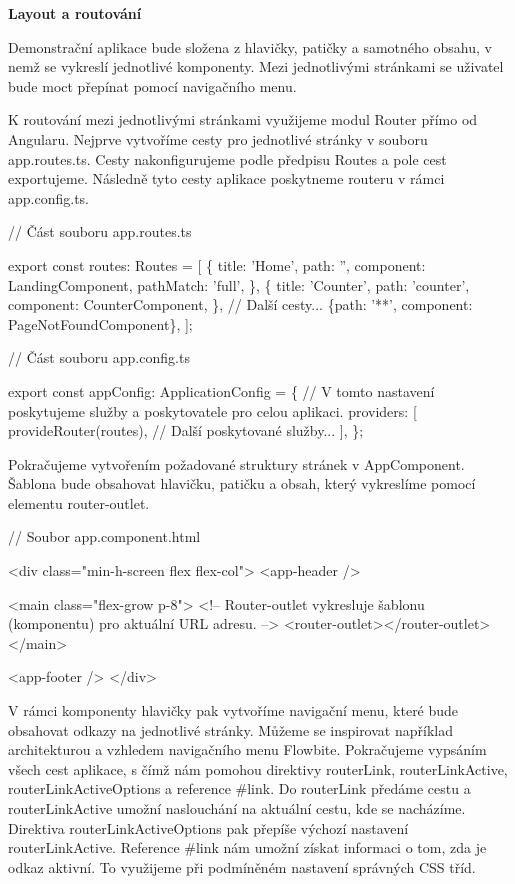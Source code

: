 \begin{flushleft}
  \textbf{Layout a routování}
\end{flushleft}

Demonstrační aplikace bude složena z hlavičky, patičky a samotného obsahu, v nemž se vykreslí jednotlivé komponenty. 
Mezi jednotlivými stránkami se uživatel bude moct přepínat pomocí navigačního menu.

K routování mezi jednotlivými stránkami využijeme modul Router přímo od Angularu. Nejprve vytvoříme cesty pro jednotlivé stránky v souboru app.routes.ts. 
Cesty nakonfigurujeme podle předpisu Routes a pole cest exportujeme. Následně tyto cesty aplikace poskytneme routeru v rámci app.config.ts.

\begin{prog}
// Část souboru app.routes.ts

export const routes: Routes = [
  \{
    title: 'Home',
    path: '',
    component: LandingComponent,
    pathMatch: 'full',
  \},
  \{
    title: 'Counter',
    path: 'counter',
    component: CounterComponent,
  \},
  // Další cesty...
  \{path: '**', component: PageNotFoundComponent\},
];

// Část souboru app.config.ts

export const appConfig: ApplicationConfig = \{
  // V tomto nastavení poskytujeme služby a poskytovatele pro celou aplikaci.
  providers: [
    provideRouter(routes),
    // Další poskytované služby...
  ],
\};
\end{prog}

Pokračujeme vytvořením požadované struktury stránek v AppComponent. Šablona bude obsahovat hlavičku, patičku a obsah, který vykreslíme pomocí elementu router-outlet. 

\begin{prog}
// Soubor app.component.html

<div class="min-h-screen flex flex-col">
  <app-header />

  <main class="flex-grow p-8">
    <!-- Router-outlet vykresluje šablonu (komponentu) pro aktuální URL adresu. -->
    <router-outlet></router-outlet>
  </main>

  <app-footer />
</div>
\end{prog}

V rámci komponenty hlavičky pak vytvoříme navigační menu, které bude obsahovat odkazy na jednotlivé stránky. 
Můžeme se inspirovat například architekturou a vzhledem navigačního menu Flowbite. 
Pokračujeme vypsáním všech cest aplikace, s čímž nám pomohou direktivy routerLink, routerLinkActive, routerLinkActiveOptions a reference \#link. 
Do routerLink předáme cestu a routerLinkActive umožní naslouchání na aktuální cestu, kde se nacházíme. Direktiva routerLinkActiveOptions pak přepíše výchozí nastavení routerLinkActive.
Reference \#link nám umožní získat informaci o tom, zda je odkaz aktivní. To využijeme při podmíněném nastavení správných CSS tříd.

